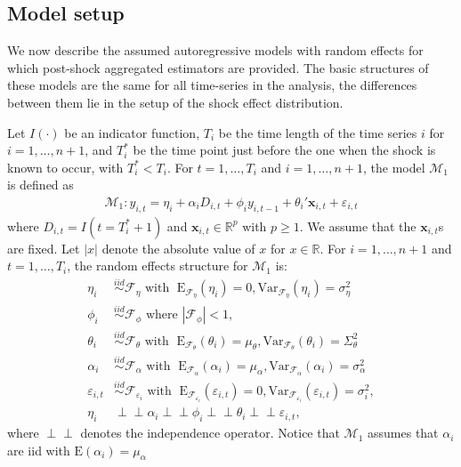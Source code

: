 \documentclass[11pt,3p,review,authoryear]{elsarticle}
\newcommand{\R}{\mathbb{R}}
\newcommand{\x}{\textbf{x}}
\def\mbf#1{\mathbf{#1}} %
\newcommand{\simiid}{\stackrel{iid}{\sim}} %
\newcommand{\indep}{\perp \!\!\! \perp } %
\def\mrm#1{\mathrm{#1}} %
\newcommand{\reals}{\mathbb{R}} %
\def\mc#1{\mathcal{#1}} %
\def\E#1{\mathrm{E}(#1)} %
\theoremstyle{definition}
\begin{document}
\subsection{Model setup}

\label{modelsetup}

We now describe the assumed autoregressive models with random effects for which post-shock aggregated estimators are provided. The basic structures of these models are the same for all time-series in the analysis, the differences between them lie in the setup of the shock effect distribution.

Let $I(\cdot)$ be an indicator function, $T_i$ be the time length of the time series $i$ for $i = 1, \ldots, n+1$, and $T_i^*$ be the time point just before the one when the shock is known to occur, with $T_i^* < T_i$.  For $t= 1, \ldots, T_i$ and $i = 1, \ldots, n+1$, the model $\mc{M}_1$ is defined as
\begin{align}
\mc{M}_1 \colon y_{i,t} =\eta_i +\alpha_i D_{i,t} + \phi_i y_{i, t-1} + \theta_i'\mbf{x}_{i,t} + \varepsilon_{i,t}\label{equation1}
\end{align}
 where $D_{i,t} = I(t = T_i^* + 1)$ 
and $\x_{i,t} \in \R^{p}$ with $p \geq 1$.  We assume that the 
$\mbf{x}_{i,t}$s are fixed. Let $|x|$ denote the absolute value of $x$ for $x\in \reals$. For $i = 1, \ldots, n+1$ and $t=1, \ldots, T_i$, the random effects structure for $\mc{M}_1$ is:
\begin{align*}
  \eta_i &\simiid \mc{F}_{\eta} \text{ with }  \; \mrm{E}_{\mc{F}_{\eta}}(\eta_i) = 0, \mrm{Var}_{\mc{F}_{\eta}}(\eta_i)  = \sigma^2_{\eta}\\
  \phi_i &\simiid \mc{F}_{\phi} \text{ where } |\mc{F}_{\phi}| < 1, \\
   \theta_i &\simiid \mc{F}_{\theta} \text{ with }  \; \mrm{E}_{\mc{F}_{\theta}}(\theta_i) = \mu_{\theta}, \mrm{Var}_{\mc{F}_{\theta}}(\theta_i)  = \Sigma^2_{\theta} \\
\alpha_i &\simiid \mc{F}_{\alpha} \text{ with }  \; \mrm{E}_{\mc{F}_{\alpha}}(\alpha_i) = \mu_{\alpha}, \mrm{Var}_{\mc{F}_{\alpha}}(\alpha_i)  = \sigma^2_{\alpha}  \\
\varepsilon_{i,t} & \simiid  \mc{F}_{\varepsilon_i} \text{ with }  \; \mrm{E}_{\mc{F}_{\varepsilon_i}}(\varepsilon_{i,t}) = 0, \mrm{Var}_{\mc{F}_{\varepsilon_i}}(\varepsilon_{i,t})  = \sigma^2_i  ,  \\
\eta_i &\indep  \alpha_i \indep \phi_i \indep \theta_i \indep \varepsilon_{i,t},
\end{align*}
where $\indep $ denotes the independence operator. Notice that $\mc{M}_1$ assumes that $\alpha_i$ are iid with $\E{\alpha_i}=\mu_{\alpha}$ 
\end{document}
